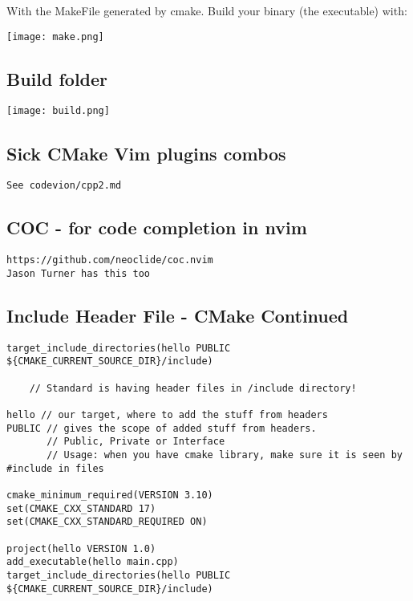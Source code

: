 With the MakeFile generated by cmake. Build your binary (the executable) with:

\begin{center}
    \texttt{[image: make.png]}
\end{center}

\subsection{Build folder}

\begin{center}
    \texttt{[image: build.png]}
\end{center}

\subsection{Sick CMake Vim plugins combos}

\begin{verbatim}
See codevion/cpp2.md
\end{verbatim}

\subsection{COC - for code completion in nvim}
\begin{verbatim}
https://github.com/neoclide/coc.nvim
Jason Turner has this too
\end{verbatim}

\subsection{Include Header File - CMake Continued}

\begin{verbatim}
target_include_directories(hello PUBLIC ${CMAKE_CURRENT_SOURCE_DIR}/include)

    // Standard is having header files in /include directory!

hello // our target, where to add the stuff from headers
PUBLIC // gives the scope of added stuff from headers. 
       // Public, Private or Interface
       // Usage: when you have cmake library, make sure it is seen by #include in files

cmake_minimum_required(VERSION 3.10)
set(CMAKE_CXX_STANDARD 17)
set(CMAKE_CXX_STANDARD_REQUIRED ON)

project(hello VERSION 1.0)
add_executable(hello main.cpp)
target_include_directories(hello PUBLIC ${CMAKE_CURRENT_SOURCE_DIR}/include)
\end{verbatim}

